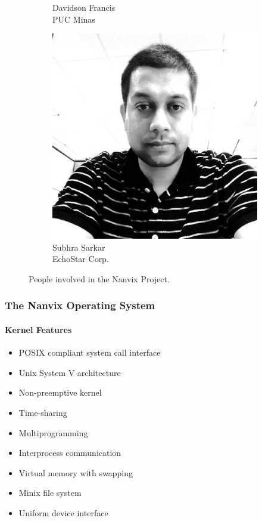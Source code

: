 \documentclass{beamer}
\begin{document}
\begin{frame}
\begin{figure}[t]
\begin{subfigure}{0.2\linewidth}
						\caption{\scriptsize{Davidson Francis\\PUC Minas}}
					\end{subfigure}
					\quad
					\quad
					\begin{subfigure}{0.2\linewidth}
						\includegraphics[width=\linewidth]{subhra}
						\caption{\scriptsize{Subhra Sarkar\\EchoStar Corp.}}
					\end{subfigure}
				\caption{People involved in the Nanvix Project.}
			\end{figure}
		\end{frame}

		\begin{frame}
		\frametitle{The Nanvix Operating System}
		\framesubtitle{Kernel Features}
			\begin{itemize}
			\setlength\itemsep{0.7em}
				\item POSIX compliant system call interface
				\item Unix System V architecture
				\item Non-preemptive kernel
				\item Time-sharing
				\item Multiprogramming
				\item Interprocess communication
				\item Virtual memory with swapping
				\item Minix file system
				\item Uniform device interface
			\end{itemize}
		\end{frame}
\end{document}
